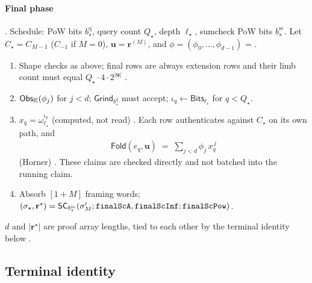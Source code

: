 \paragraph{Final phase} 
. Schedule: PoW bits $b^{\mathrm q}_\star$, query
count $Q_\star$, depth $\ell_\star$, sumcheck PoW bits $b^{\mathrm{sc}}_\star$.
Let $C_\star = C_{M-1}$ ($C_{-1}$ if $M=0$), $\mathbf u = \mathbf r^{(M)}$, and
$\phi = (\phi_0,\dots,\phi_{d-1})$ = .
\begin{enumerate}
\item Shape checks as above; final rows are always extension rows and their limb
  count must equal $Q_\star \cdot 4 \cdot 2^{|\mathbf u|}$
   .
\item $\mathsf{Obs}_{\mathbb{K}}(\phi_j)$ for $j<d$; $\mathsf{Grind}_{b^{\mathrm q}_\star}$
  must accept; $\iota_q \gets \mathsf{Bits}_{\ell_\star}$ for $q<Q_\star$.
\item $x_q = \omega_{\ell_\star}^{\iota_q}$ (computed, not read)
   . Each row
  authenticates against $C_\star$ on its own path, and
  \begin{align}
    \mathsf{Fold}(e_q, \mathbf u) \;=\; \sum_{j<d} \phi_j\, x_q^{\,j}
  \end{align}
  (Horner)  .
  These claims are checked directly and not batched into the running claim.
\item Absorb $[1+M]$ framing words;
  $(\sigma_\star, \mathbf r^\star) = \mathsf{SC}_{b^{\mathrm{sc}}_\star}(\sigma_M';
  \texttt{finalScA},\texttt{finalScInf};\texttt{finalScPow})$.
\end{enumerate}
$d$ and $|\mathbf r^\star|$ are proof array lengths, tied to each other by the
terminal identity below .

\subsection{Terminal identity}
\label{subsec:sv-terminal}

